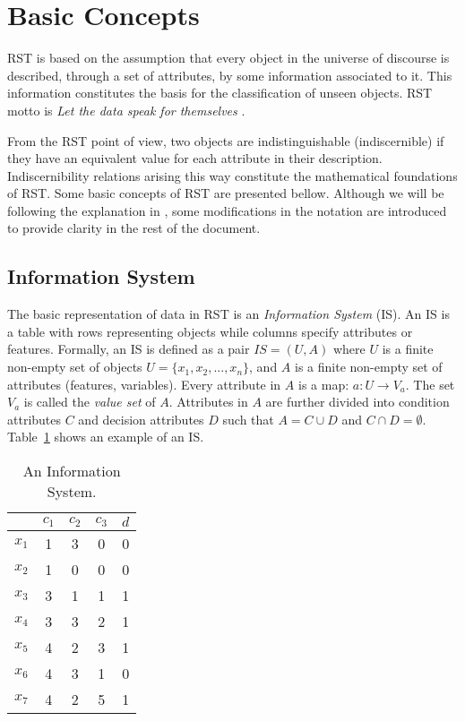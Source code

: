 \documentclass[citenumber]{llncs}
\begin{document}
\section{Basic Concepts}\label{basicConcepts}
  RST is based on the assumption that every object in the universe of discourse is described, through a 
  set of attributes, by some information associated to it. This information constitutes the basis for the
  classification of unseen objects. RST motto is \textit{Let the data speak for themselves} \cite{Tiwari14}.
  
  From the RST point of view, two objects are indistinguishable (indiscernible) if they have an equivalent 
  value for each attribute in their description. Indiscernibility relations arising this way constitute the
  mathematical foundations of RST. 
  Some basic concepts of RST are presented bellow. Although we will be following the explanation 
  in \cite{Polkowski00}, some modifications in the notation are introduced to provide clarity in the rest 
  of the document.
  
\subsection{Information System}
  The basic representation of data in RST is an \emph{Information System} (IS). An IS is a table with rows
  representing objects while columns specify attributes or features. Formally, an IS is defined as a pair
  $IS=(U,A)$ where $U$ is a finite non-empty set of objects $U=\lbrace x_1,x_2,...,x_n\rbrace$, and $A$ is a 
  finite non-empty set
  of attributes (features, variables). Every attribute in $A$ is a map: $a: U \rightarrow V_a$. The set $V_a$ is
  called the \textit{value set} of $A$. Attributes in $A$ are further divided into condition attributes $C$ and 
  decision attributes $D$ such that $A=C \cup D$ and $C \cap D =\emptyset$. 
  Table~\ref{tab_IS} shows an example of an IS.
  
  
 \begin{table}[htb]
		\caption{An Information System.} \label{tab_IS}
		\centering
 	\begin{tabular}{c||c|c|c||c}
 			  & $c_1$ & $c_2$ &  $c_3$ & $d$ \\
 		\hline \hline
		$x_1$ &   1   &    3  &  0  &   0   \\
		$x_2$ &   1   &    0  &  0  &   0   \\
		$x_3$ &   3   &    1  &  1  &   1   \\
		$x_4$ &   3   &    3  &  2  &   1   \\
		$x_5$ &   4   &    2  &  3  &   1   \\
		$x_6$ &   4   &    3  &  1  &   0   \\
		$x_7$ &   4   &    2  &  5  &   1   \\
 	\end{tabular}             
 \end{table}
 
\end{document}
